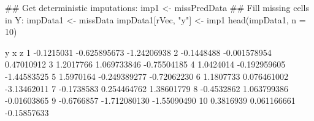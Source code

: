 \begin{Schunk}
\begin{Sinput}
 ## Get deterministic imputations:
 imp1 <- missPredData %*% betaHat
 ## Fill missing cells in Y:
 impData1 <- missData
 impData1[rVec, "y"] <- imp1
 head(impData1, n = 10)
\end{Sinput}
\begin{Soutput}
            y            x           z
1  -0.1215031 -0.625895673 -1.24206938
2  -0.1448488 -0.001578954  0.47010912
3   1.2017766  1.069733846 -0.75504185
4   1.0424014 -0.192959605 -1.44583525
5   1.5970164 -0.249389277 -0.72062230
6   1.1807733  0.076461002 -3.13462011
7  -0.1738583  0.254464762  1.38601779
8  -0.4532862  1.063799386 -0.01603865
9  -0.6766857 -1.712080130 -1.55090490
10  0.3816939  0.061166661 -0.15857633
\end{Soutput}
\end{Schunk}
